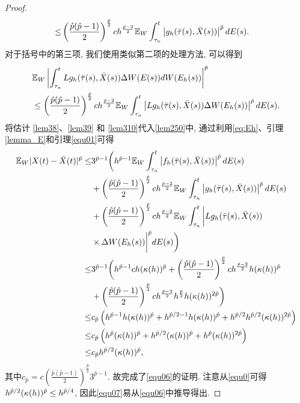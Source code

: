 \begin{proof}
\begin{align}
    \leq& \left(\frac{\hat{p}(\hat{p}-1)}{2}\right)^{\frac{\hat{p}}{2}}ch^{\frac{\hat{p}-2}{2}}\mathbb{E}_W\int_{\tau_n}^{t}\left|g_{h}(\bar{\tau}(s),\bar{X}(s))\right|^{\hat{p}}dE(s).
\end{align}
对于括号中的第三项, 我们使用类似第二项的处理方法, 可以得到
 \begin{align}
    \label{lem310}
    &\mathbb{E}_W\left|\int_{\tau_n}^{t}{Lg_{h}(\bar{\tau}(s),\bar{X}(s))\Delta W(E(s))dW(E_{h}(s))}\right|^{\hat{p}}\nonumber\\
    &\leq \left(\frac{\hat{p}(\hat{p}-1)}{2}\right)^{\frac{\hat{p}}{2}}ch^{\frac{\hat{p}-2}{2}}\mathbb{E}_W\int_{\tau_n}^{t}\left|Lg_{h}(\bar{\tau}(s),\bar{X}(s))\Delta W(E_{h}(s))\right|^{\hat{p}}dE(s).
\end{align}
 将估计 \eqref{lem38}、\eqref{lem39} 和 \eqref{lem310}代入\eqref{lem250}中, 通过利用\eqref{eq:Eh}、引理\ref{lemma_E}和引理\ref{equ01}可得
  \begin{align*}
     \mathbb{E}_W|X(t)-\bar{X}(t)|^{\hat{p}} \leq&
     3^{\hat{p}-1}\bigg(h^{\hat{p}-1}\mathbb{E}_W\int_{\tau_n}^{t}{\left|f_{h}(\bar{\tau}(s),\bar{X}(s))\right|^{\hat{p}}dE(s)}\\
     &+\left(\frac{\hat{p}(\hat{p}-1)}{2}\right)^{\frac{\hat{p}}{2}}ch^{\frac{\hat{p}-2}{2}}\mathbb{E}_W\int_{\tau_n}^{t}\left|g_{h}(\bar{\tau}(s),\bar{X}(s))\right|^{\hat{p}}dE(s)\\
     &+\left(\frac{\hat{p}(\hat{p}-1)}{2}\right)^{\frac{\hat{p}}{2}}ch^{\frac{\hat{p}-2}{2}}\mathbb{E}_W\int_{\tau_n}^{t}\bigg|Lg_{h}(\bar{\tau}(s),\bar{X}(s))\\
     &\times \Delta W(E_{h}(s))\bigg|^{\hat{p}}dE(s)\bigg)\\
     \leq & 3^{\hat{p}-1}\bigg(h^{\hat{p}-1}ch(\kappa(h))^{\hat{p}}+\left(\frac{\hat{p}(\hat{p}-1)}{2}\right)^{\frac{\hat{p}}{2}}ch^{\frac{\hat{p}-2}{2}}h(\kappa(h))^{\hat{p}}\\
     &+\left(\frac{\hat{p}(\hat{p}-1)}{2}\right)^{\frac{\hat{p}}{2}}ch^{\frac{\hat{p}-2}{2}}h^{\frac{\hat{p}}{2}}h(\kappa(h))^{2\hat{p}}\bigg)\\
     \leq & c_{\hat{p}}\left(h^{\hat{p}-1}h(\kappa(h))^{\hat{p}}+h^{\hat{p}/2-1}h(\kappa(h))^{\hat{p}}+h^{\hat{p}/2}h^{\hat{p}/2}(\kappa(h))^{2\hat{p}}\right)\\
     \leq & c_{\hat{p}}\left(h^{\hat{p}}(\kappa(h))^{\hat{p}}+h^{\hat{p}/2}(\kappa(h))^{\hat{p}}+h^{\hat{p}}(\kappa(h))^{2\hat{p}}\right)\\
     \leq &c_{\hat{p}}h^{\hat{p}/2}(\kappa(h))^{\hat{p}},
 \end{align*}
其中$c_{\hat{p}}=c\left(\frac{\hat{p}(\hat{p}-1)}{2}\right)^{\frac{\hat{p}}{2}}3^{\hat{p}-1}$. 故完成了\eqref{equ06}的证明. 注意从\eqref{equ0}可得$h^{\hat{p}/2}(\kappa(h))^{\hat{p}}\leq h^{\hat{p}/4}$, 因此\eqref{equ07}易从\eqref{equ06}中推导得出.
\end{proof}
